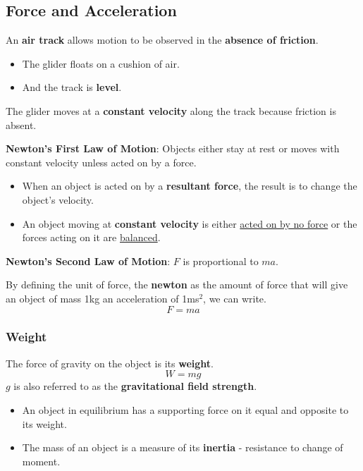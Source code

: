 \subsection{Force and Acceleration}

An \textbf{air track} allows motion to be observed in the \textbf{absence of friction}.
\begin{itemize}
    \item The glider floats on a cushion of air.
    \item And the track is \textbf{level}.
\end{itemize}
The glider moves at a \textbf{constant velocity} along the track because friction is absent.

\textbf{Newton's First Law of Motion}: Objects either stay at rest or moves with constant velocity unless acted on by a force.
\begin{itemize}
    \item When an object is acted on by a \textbf{resultant force}, the result is to change the object's velocity.
    \item An object moving at \textbf{constant velocity} is either \underline{acted on by no force} or the forces acting on it are \underline{balanced}.
\end{itemize}

\textbf{Newton's Second Law of Motion}: $F$ is proportional to $ma$.

By defining the unit of force, the \textbf{newton} as the amount of force that will give an object of mass 1kg an acceleration of 1ms$^2$, we can write.
$$F=ma$$

\subsubsection*{Weight}
The force of gravity on the object is its \textbf{weight}.
$$W=mg$$
$g$ is also referred to as the \textbf{gravitational field strength}.

\begin{itemize}
    \item An object in equilibrium has a supporting force on it equal and opposite to its weight.
    \item The mass of an object is a measure of its \textbf{inertia} - resistance to change of moment.
\end{itemize}
